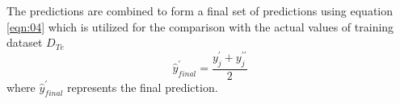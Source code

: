 \documentclass[sn-mathphys,Numbered]{sn-jnl}
\theoremstyle{thmstyleone}
\theoremstyle{thmstyletwo}
\theoremstyle{thmstylethree}
\begin{document}
The predictions are combined to form a final set of predictions using equation \ref{eqn:04} which is utilized for the comparison with the actual values of training dataset $D_{Te}$
\begin{equation}
\label{eqn:04}
\hat{y}_{final}^{\prime}=\frac{y_j^{\prime}+y_j^{\prime\prime}}{2}
\end{equation}
where $\hat{y}_{final}^{\prime}$ represents the final prediction.


\begin{figure}[ht!]
{}
\hfill
{}\\

\end{figure}
\end{document}
